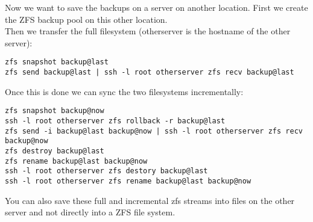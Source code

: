 \documentclass[a4paper,10pt]{article}
\begin{document}
Now we want to save the backups on a server on another location. First we create the ZFS backup pool on this other location.\\
Then we transfer the full filesystem (otherserver is the hostname of the other server):
\begin{verbatim}
zfs snapshot backup@last
zfs send backup@last | ssh -l root otherserver zfs recv backup@last
\end{verbatim}
Once this is done we can sync the two filesystems incrementally:
\begin{verbatim}
zfs snapshot backup@now
ssh -l root otherserver zfs rollback -r backup@last
zfs send -i backup@last backup@now | ssh -l root otherserver zfs recv backup@now
zfs destroy backup@last
zfs rename backup@last backup@now
ssh -l root otherserver zfs destory backup@last
ssh -l root otherserver zfs rename backup@last backup@now
\end{verbatim}
You can also save these full and incremental zfs streams into files on the other server and not directly into a ZFS file system.
\end{document}
